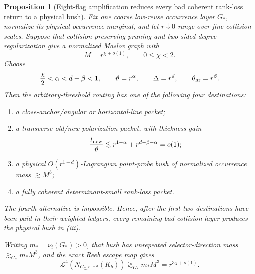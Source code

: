 \documentclass[10pt]{article}
\newtheorem{proposition}[theorem]{Proposition}
\begin{document}
\begin{proposition}[Eight-flag amplification reduces every bad coherent rank-loss return to a
physical bush]
\label{prop:v081-rank-loss-to-bush-reduction}
Fix one coarse low-reuse occurrence layer \(G_*\), normalize its physical occurrence marginal, and
let \(r\downarrow0\) range over fine collision scales.  Suppose that collision-preserving pruning
and two-sided degree regularization give a normalized Maslov graph with
\[
M=r^{\chi+o(1)},
\qquad
0\le\chi<2.
\]
Choose
\[
\frac{\chi}{2}<\alpha<d-\beta<1,
\qquad
\vartheta=r^\alpha,
\qquad
\Delta=r^d,
\qquad
\theta_{\rm hr}=r^\beta.
\]
Then the arbitrary-threshold routing has one of the following four destinations:
\begin{enumerate}[label=\textnormal{(\roman*)}]
\item a close-anchor/angular or horizontal-line packet;
\item a transverse old/new polarization packet, with thickness gain
\[
\frac{t_{\rm new}}{\vartheta}
\lesssim
r^{1-\alpha}+r^{d-\beta-\alpha}
=o(1);
\]
\item a physical \(O(r^{1-d})\)-Lagrangian point-probe bush of normalized occurrence mass
\(\gtrsim M^3\);
\item a fully coherent determinant-small rank-loss packet.
\end{enumerate}
The fourth alternative is impossible.  Hence, after the first two destinations have been paid in
their weighted ledgers, every remaining bad collision layer produces the physical bush in
\textnormal{(iii)}.

Writing \(m_*=\nu_i(G_*)>0\), that bush has unrepeated selector-direction mass
\(\gtrsim_{G_*}m_*M^3\), and the exact Reeb escape map gives
\begin{equation}
\label{eq:v081-forced-bush-neighborhood-credit}
\boxed{
\mathcal L^4\!\left(N_{C_{G_*}r^{1-d}}(K_b)\right)
\gtrsim_{G_*}
m_*M^3
=
r^{3\chi+o(1)}.
}
\end{equation}
\end{proposition}
\end{document}
